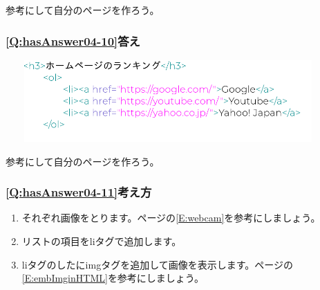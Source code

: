 \documentclass[a4paper,12pt]{jarticle}
\begin{document}
\bigskip

参考にして自分のページを作ろう。


\bigskip

\subsubsection{\bfseries
\ref*{Q:hasAnswer04-10}答え}


\centering
\includegraphics[width=12.448cm,height=3.129cm]{textbook-img241.png}
\flushleft

\bigskip

\centering
{}
\flushleft

\bigskip
参考にして自分のページを作ろう。

\clearpage\subsubsection{\bfseries
\ref*{Q:hasAnswer04-11}考え方}

\begin{enumerate}
  \item
        それぞれ画像をとります。\pageref*{E:webcam}ページの\ref*{E:webcam}を参考にしましょう。
  \item リストの項目をliタグで追加します。
  \item
        liタグのしたにimgタグを追加して画像を表示します。\pageref*{E:embImginHTML}ページの\ref*{E:embImginHTML}を参考にしましょう。
\end{enumerate}
\centering
{}
\flushleft
\end{document}
